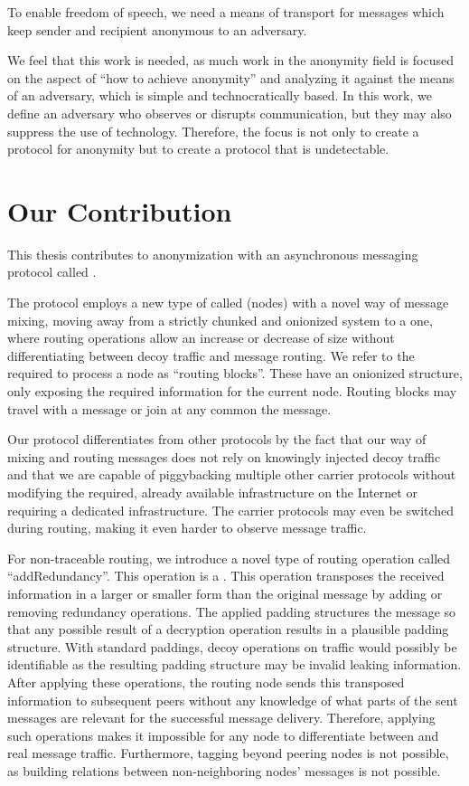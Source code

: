 To enable freedom of speech, we need a means of transport for messages which keep sender and recipient anonymous to an adversary.

We feel that this work is needed, as much work in the anonymity field is focused on the aspect of ``how to achieve anonymity'' and analyzing it against the means of an adversary, which is simple and technocratically based. In this work, we define an adversary who observes or disrupts communication, but they may also suppress the use of technology. Therefore, the focus is not only to create a protocol for anonymity but to create a protocol that is undetectable.

\chapter{Our Contribution}
This thesis contributes to anonymization with an asynchronous messaging protocol called \MessageVortex.

The protocol employs a new type of  called \VortexNodes{} (nodes) with a novel way of message mixing, moving away from a strictly chunked and onionized system to a one, where routing operations allow an increase or decrease of size without differentiating between decoy traffic and message routing. We refer to the  required to process a node as ``routing blocks''. These  have an onionized structure, only exposing the required information for the current node. Routing blocks may travel with a message or join at any common \VortexNode the message.

Our protocol differentiates from other protocols by the fact that our way of mixing and routing messages does not rely on knowingly injected decoy traffic and that we are capable of piggybacking multiple other carrier protocols without modifying the required, already available infrastructure on the Internet or requiring a dedicated infrastructure. The carrier protocols may even be switched during routing, making it even harder to observe message traffic. 

For non-traceable routing, we introduce a novel type of routing operation called ``add\-Redundancy''. This operation is a  . This operation transposes the received information in a larger or smaller form than the original message by adding or removing redundancy operations. The applied padding structures the message so that any possible result of a decryption operation results in a plausible padding structure. With standard paddings, decoy operations on traffic would possibly be identifiable as the resulting padding structure may be invalid leaking information. After applying these operations, the routing node sends this transposed information to subsequent peers without any knowledge of what parts of the sent messages are relevant for the successful message delivery. Therefore, applying such operations makes it impossible for any node to differentiate between  and real message traffic. Furthermore, tagging beyond peering nodes is not possible, as building relations between non-neighboring nodes' messages is not possible.

